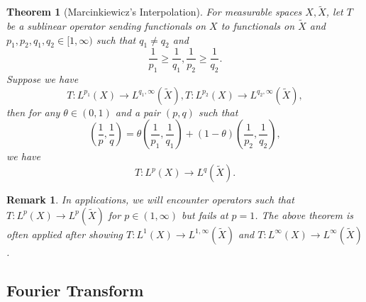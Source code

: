 \documentclass[8pt]{article}
\newtheorem{theorem}{Theorem} [section]
\newtheorem{remark}{Remark}[section]
\begin{document}
\begin{theorem}[Marcinkiewicz's Interpolation]
  \label{theorem_2_1}
  For measurable spaces $X,\tilde{X}$, let $T$ be a sublinear operator sending functionals on $X$ to functionals on $\tilde{X}$ and $p_1,p_2,q_1,q_2\in[1,\infty)$ such that $q_1\not=q_2$ and 
  \begin{equation*}
    {\frac 1 {p_1}}\geq {\frac 1 {q_1}},{\frac 1 {p_2}}\geq {\frac 1 {q_2}}.
  \end{equation*}
  Suppose we have
  \begin{equation*}
    T:L^{p_1}(X)\to L^{q_1,\infty}(\tilde{X}), T:L^{p_2}(X)\to L^{q_2,\infty}(\tilde{X}), 
  \end{equation*}
  then for any $\theta\in(0,1)$ and a pair $(p,q)$ such that
  \begin{equation*}
    \left({\frac 1 p},{\frac 1 q}\right) = \theta\left({\frac 1 {p_1}},{\frac 1 {q_1}}\right)+(1-\theta)\left({\frac 1 {p_2}},{\frac 1 {q_2}}\right),
  \end{equation*}
  we have
  \begin{equation*}
    T:L^p(X)\to L^q(\tilde{X}).
  \end{equation*}
\end{theorem}
\begin{remark}
  In applications, we will encounter operators such that $T:L^p(X)\to L^p(\tilde{X})$ for $p\in (1,\infty)$ but fails at $p=1$. 
  The above theorem is often applied after showing $T:L^1(X)\to L^{1,\infty}(\tilde{X})$ and $T:L^\infty(X)\to L^\infty(\tilde{X})$.
\end{remark}
\subsection{Fourier Transform}
\end{document}
